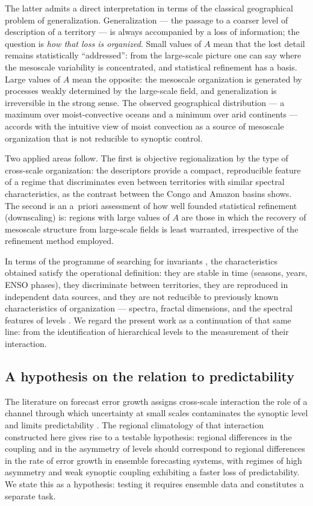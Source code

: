 \documentclass[11pt,a4paper]{article}
\begin{document}
The latter admits a direct interpretation in terms of the classical geographical problem of generalization. Generalization --- the passage to a coarser level of description of a territory --- is always accompanied by a loss of information; the question is \emph{how that loss is organized}. Small values of $A$ mean that the lost detail remains statistically ``addressed'': from the large-scale picture one can say where the mesoscale variability is concentrated, and statistical refinement has a basis. Large values of $A$ mean the opposite: the mesoscale organization is generated by processes weakly determined by the large-scale field, and generalization is irreversible in the strong sense. The observed geographical distribution --- a maximum over moist-convective oceans and a minimum over arid continents --- accords with the intuitive view of moist convection as a source of mesoscale organization that is not reducible to synoptic control.

Two applied areas follow. The first is objective regionalization by the type of cross-scale organization: the descriptors provide a compact, reproducible feature of a regime that discriminates even between territories with similar spectral characteristics, as the contrast between the Congo and Amazon basins shows. The second is an a~priori assessment of how well founded statistical refinement (downscaling) is: regions with large values of $A$ are those in which the recovery of mesoscale structure from large-scale fields is least warranted, irrespective of the refinement method employed.

In terms of the programme of searching for invariants \cite{Puzachenko2010}, the characteristics obtained satisfy the operational definition: they are stable in time (seasons, years, ENSO phases), they discriminate between territories, they are reproduced in independent data sources, and they are not reducible to previously known characteristics of organization --- spectra, fractal dimensions, and the spectral features of levels \cite{Krenke2019}. We regard the present work as a continuation of that same line: from the identification of hierarchical levels to the measurement of their interaction.

\subsection{A hypothesis on the relation to predictability}

The literature on forecast error growth assigns cross-scale interaction the role of a channel through which uncertainty at small scales contaminates the synoptic level and limits predictability \cite{Lorenz1969,Zhang2007,RotunnoSnyder2008,Judt2020}. The regional climatology of that interaction constructed here gives rise to a testable hypothesis: regional differences in the coupling and in the asymmetry of levels should correspond to regional differences in the rate of error growth in ensemble forecasting systems, with regimes of high asymmetry and weak synoptic coupling exhibiting a faster loss of predictability. We state this as a hypothesis: testing it requires ensemble data and constitutes a separate task.
\end{document}
